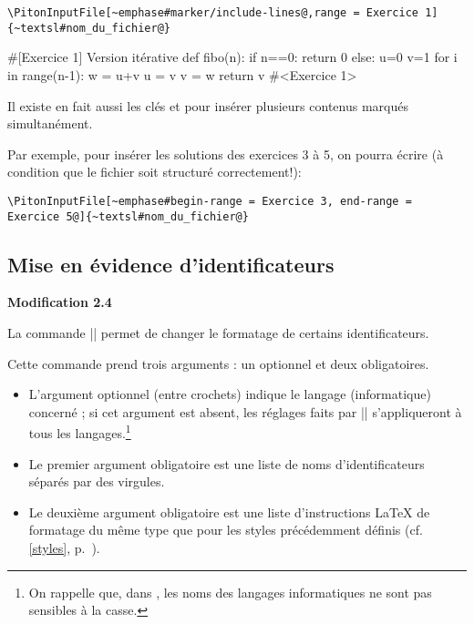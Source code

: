 \documentclass[dvipsnames,svgnames]{article}
\begin{document}
\begin{Verbatim}
\PitonInputFile[~emphase#marker/include-lines@,range = Exercice 1]{~textsl#nom_du_fichier@}
\end{Verbatim}

\begin{Piton}
#[Exercice 1] Version itérative
def fibo(n):
    if n==0: return 0 
    else:
        u=0
        v=1
        for i in range(n-1):
            w = u+v
            u = v
            v = w
        return v
#<Exercice 1>
\end{Piton}


\bigskip
{}
Il existe en fait aussi les clés  et  pour insérer plusieurs
contenus marqués simultanément. 

Par exemple, pour insérer les solutions des exercices 3 à 5, on pourra écrire (à condition que le fichier soit
structuré correctement!):

\begin{Verbatim}
\PitonInputFile[~emphase#begin-range = Exercice 3, end-range = Exercice 5@]{~textsl#nom_du_fichier@}
\end{Verbatim}




\subsection{Mise en évidence d'identificateurs}

\label{SetPitonIdentifier}

\colorbox{yellow!50}{\bfseries Modification 2.4}\par\nobreak

\smallskip
La commande |\SetPitonIdentifier| permet de changer le formatage de certains identificateurs.

\smallskip
Cette commande prend trois arguments : un optionnel et deux obligatoires.

\begin{itemize}
\item L'argument optionnel (entre crochets) indique le langage (informatique) concerné ; si cet
argument est absent, les réglages faits par |\SetPitonIdentifier| s'appliqueront à tous les langages.\footnote{On rappelle que, dans , les noms des langages informatiques ne sont pas
  sensibles à la casse.}

\item Le premier argument obligatoire est une liste de noms d'identificateurs séparés par des virgules.

\item Le deuxième argument obligatoire est une liste d'instructions LaTeX de formatage du même type que pour les
styles précédemment définis (cf. \ref{styles}, p.~\pageref{styles}).


\end{itemize}
\end{document}
